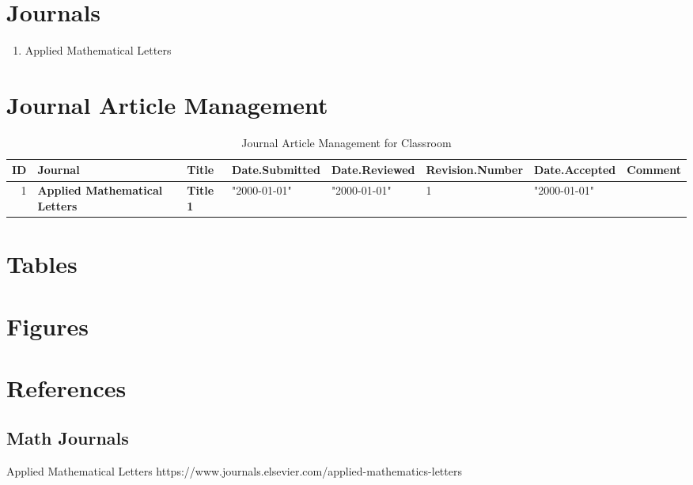 

\section{Journals}

\begin{enumerate}
\item Applied Mathematical Letters \cite{key1}
\end{enumerate}


\section{Journal Article Management}


\begin{table}[ht]
\caption{Journal Article Management for Classroom}
\begin{tabular}{rlllllll}
\hline
ID & Journal & Title & Date.Submitted & Date.Reviewed & Revision.Number & Date.Accepted & Comment \\
\hline
1 & \textbf{Applied Mathematical Letters} \cite{key1} & \textbf{Title 1} & "2000-01-01" & "2000-01-01" & 1 & "2000-01-01" & \\
\hline
\end{tabular}
\end{table}


\section{Tables}


\section{Figures}



\section{References}

\subsection{Math Journals}

 Applied Mathematical Letters
\newblock https://www.journals.elsevier.com/applied-mathematics-letters

